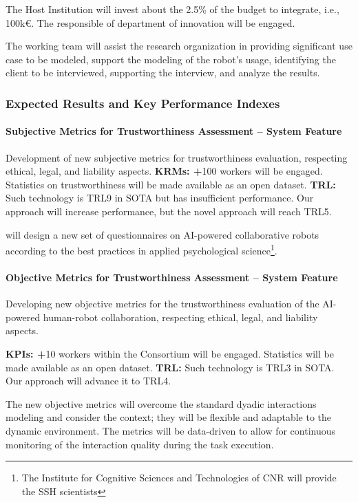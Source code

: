 The Host Institution will invest about the 2.5\% of the budget to
integrate, i.e., 100k€. The responsible of department of innovation will
be engaged.

The working team will assist the research organization in providing
significant use case to be modeled, support the modeling of the robot's
usage, identifying the client to be interviewed, supporting the
interview, and analyze the results.

\subsubsection{\texorpdfstring{Expected Results and Key Performance
Indexes
}{Expected Results and Key Performance Indexes }}\label{expected-results-and-key-performance-indexes-3}

\paragraph{Subjective Metrics for Trustworthiness Assessment -- System
Feature}\label{subjective-metrics-for-trustworthiness-assessment-system-feature}

Development of new subjective metrics for trustworthiness evaluation,
respecting ethical, legal, and liability aspects. \textbf{KRMs: +}100
workers will be engaged. Statistics on trustworthiness will be made
available as an open dataset. \textbf{\textbar{} TRL:} Such technology
is TRL9 in SOTA but has insufficient performance. Our approach will
increase performance, but the novel approach will reach TRL5.

 will design a new set of questionnaires on AI-powered
collaborative robots according to the best practices in applied
psychological science\footnote{The Institute for Cognitive Sciences and
  Technologies of CNR will provide the SSH scientists}.

\paragraph{Objective Metrics for Trustworthiness Assessment -- System
Feature}\label{objective-metrics-for-trustworthiness-assessment-system-feature}

Developing new objective metrics for the trustworthiness evaluation of
the AI-powered human-robot collaboration, respecting ethical, legal, and
liability aspects.

\textbf{KPIs: +}10 workers within the Consortium will be engaged.
Statistics will be made available as an open dataset. \textbar{}
\textbf{TRL:} Such technology is TRL3 in SOTA. Our approach will advance
it to TRL4.

The new objective metrics will overcome the standard dyadic interactions
modeling and consider the context; they will be flexible and adaptable
to the dynamic environment. The metrics will be data-driven to allow for
continuous monitoring of the interaction quality during the task
execution.
